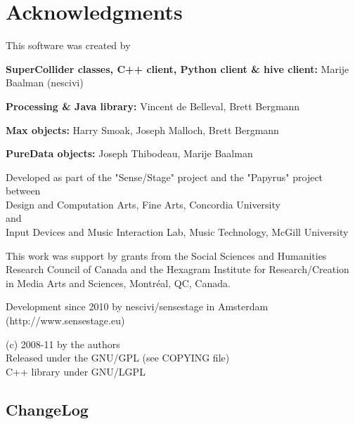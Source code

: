 \documentclass[letterpaper,10pt]{article}
\begin{document}
\section*{Acknowledgments}\label{sec:acknowledgments}
This software was created by

\textbf{SuperCollider classes, C++ client, Python client \& hive client:}
Marije Baalman (nescivi)  

\textbf{Processing \& Java library:}
Vincent de Belleval,
Brett Bergmann

\textbf{Max objects:}
Harry Smoak,
Joseph Malloch, 
Brett Bergmann

\textbf{PureData objects:}
Joseph Thibodeau, Marije Baalman

Developed as part of the "Sense/Stage" project and the "Papyrus" project between\\
Design and Computation Arts, Fine Arts, Concordia University\\
and\\
Input Devices and Music Interaction Lab, Music Technology, McGill University

This work was support by grants from the Social Sciences and Humanities Research Council of Canada and the Hexagram Institute for Research/Creation in Media Arts and Sciences, Montr\'eal, QC, Canada.

Development since 2010 by nescivi/sensestage in Amsterdam (http://www.sensestage.eu)

\vspace*{0.5cm}
(c) 2008-11 by the authors\\
Released under the GNU/GPL (see COPYING file)\\
C++ library under GNU/LGPL

\subsection*{ChangeLog}
\end{document}
